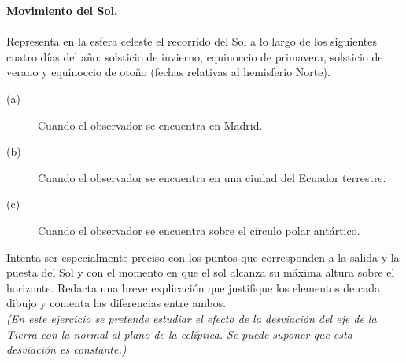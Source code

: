 \documentclass{article}
\begin{document}
\begin{ej}
\normalfont \textbf{Movimiento del Sol.} \\ \\
Representa en la esfera celeste el recorrido del Sol a lo largo de los siguientes cuatro días del año: solsticio de invierno, equinoccio de primavera, solsticio de verano y equinoccio de otoño (fechas relativas al hemisferio Norte).
\begin{description}
\item[(a)] Cuando el observador se encuentra en Madrid.
\item[(b)] Cuando el observador se encuentra en una ciudad del Ecuador terrestre.
\item[(c)] Cuando el observador se encuentra sobre el círculo polar antártico.
\end{description}
Intenta ser especialmente preciso con los puntos que corresponden a la salida y la puesta del Sol y con el momento en que el sol alcanza su máxima altura sobre el horizonte. Redacta una breve explicación que justifique los elementos de cada dibujo y comenta las diferencias entre ambos. \\ 
\textit{(En este ejercicio se pretende estudiar el efecto de la desviación del eje de la Tierra con la normal al plano de la eclíptica. Se puede suponer que esta desviación es constante.)}
\end{ej}
\end{document}
